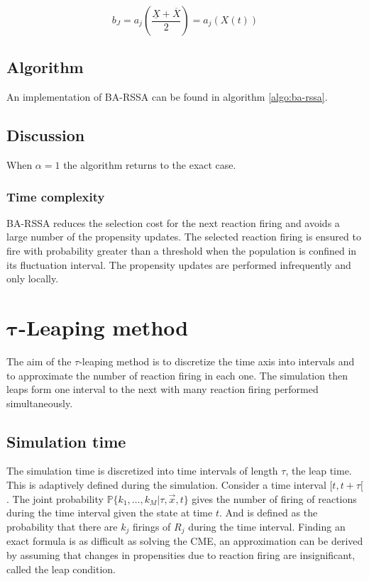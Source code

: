   $$b_J = a_j\left(\frac{\underline{X}+\overline{X}}{2}\right) = a_j(X(t))$$

  \subsection{Algorithm}
  An implementation of BA-RSSA can be found in algorithm \ref{algo:ba-rssa}.

  

  \subsection{Discussion}
  When $\alpha = 1$ the algorithm returns to the exact case.

    \subsubsection{Time complexity}
    BA-RSSA reduces the selection cost for the next reaction firing and avoids a large number of the propensity updates.
    The selected reaction firing is ensured to fire with  probability greater than a threshold when the population is confined in its fluctuation interval.
    The propensity updates are performed infrequently and only locally.


\section{$\mathbf{\tau}$-Leaping method}
The aim of the $\tau$-leaping method is to discretize the time axis into intervals and to approximate the number of reaction firing in each one.
The simulation then leaps form one interval to the next with many reaction firing performed simultaneously.

  \subsection{Simulation time}
  The simulation time is discretized into time intervals of length $\tau$, the leap time.
  This is adaptively defined during the simulation.
  Consider a time interval $[t, t+\tau[$.
  The joint probability $\mathbb{P}\{k_1, \dots, k_M|\tau,\vec{x}, t\}$ gives the number of firing of reactions during the time interval given the state at time $t$.
  And is defined as the probability that there are $k_j$ firings of $R_j$ during the time interval.
  Finding an exact formula is as difficult as solving the CME, an approximation can be derived by assuming that changes in propensities due to reaction firing are insignificant, called the leap condition.

